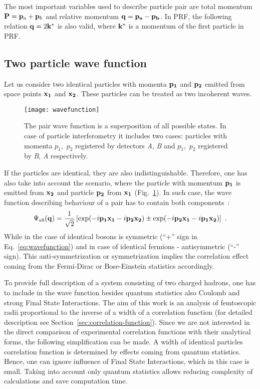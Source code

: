       The most important variables used to describe particle pair are total momentum $\mathbf{P} = \mathbf{p}_a + \mathbf{p}_b$ and relative momentum $\mathbf{q} = \mathbf{p_a} - \mathbf{p_b}$.
      In PRF, the following relation $\mathbf{q} = 2 \mathbf{k}^{*}$ is also valid, where $\mathbf{k}^{*}$ is a momentum of the first particle in PRF.

    \subsection{Two particle wave function}
      Let us consider two identical particles with momenta $\mathbf{p_1}$ and $\mathbf{p_2}$ emitted from space points $\mathbf{x_1}$ and $\mathbf{x_2}$.
      These particles can be treated as two incoherent waves.
      \begin{figure}[h]
        \centering
        \texttt{[image: wavefunction]}
        \caption{The pair wave function is a superposition of all possible states. In case of particle interferometry it includes two cases: particles with momenta $p_1$,~$p_2$ registered by detectors \textit{A}, \textit{B} and $p_1$,~$p_2$ registered by \textit{B}, \textit{A} respectively.}
        \label{fig:wavefunction}
      \end{figure}
      If the particles are identical, they are also indistinguishable.
      Therefore, one has also take into account the scenario, where the particle with momentum $\mathbf{p_1}$ is emitted from $\mathbf{x_2}$ and particle $\mathbf{p_2}$ from $\mathbf{x_1}$ (Fig.~\ref{fig:wavefunction}).
      In such case, the wave function describing behaviour of a pair has to contain both components~\cite{drkisiel}:
      \begin{equation}
      \label{eq:wavefunction}
        \Psi_{ab}(\mathbf{q})=\frac{1}{\sqrt{2}} \left[ \exp(- i \mathbf{p_1}\mathbf{x_1} - i \mathbf{p_2}\mathbf{x_2}) \pm \exp(- i \mathbf{p_2}\mathbf{x_1} - i \mathbf{p_1}\mathbf{x_2}) \right]~.
      \end{equation}
      While in the case of identical bosons is symmetric (``+'' sign in Eq.~\ref{eq:wavefunction}) and in case of identical fermions - antisymmetric (``-'' sign).
      This anti-symmetrization or symmetrization implies the correlation effect coming from the Fermi-Dirac or Bose-Einstein statistics accordingly.

      To provide full description of a system consisting of two charged hadrons, one has to include in the wave function besides quantum statistics also Coulomb and strong Final State Interactions.
      The aim of this work is an analysis of femtoscopic radii proportional to the inverse of a width of a correlation function (for detailed description see Section~\ref{sec:correlation-function}).
      Since we are not interested in the direct comparison of experimental correlation functions with their analytical forms, the following simplification can be made.
      A width of identical particles correlation function is determined by effects coming from quantum statistics.
      Hence, one can ignore influence of Final State Interactions, which in this case is small.
      Taking into account only quantum statistics allows reducing complexity of calculations and save computation time.

